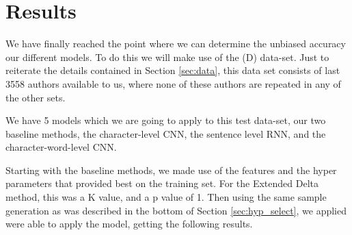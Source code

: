 \section{Results} \label{sec:results}

We have finally reached the point where we can determine the unbiased accuracy
our different models. To do this we will make use of the (D) data-set. Just
to reiterate the details contained in Section \ref{sec:data}, this data set
consists of last 3558 authors available to us, where none of these authors are
repeated in any of the other sets.

We have 5 models which we are going to apply to this test data-set,
our two baseline methods, the character-level \gls{CNN}, the sentence
level RNN, and the character-word-level \gls{CNN}.

Starting with the baseline methods, we made use of the features and the
hyper parameters that provided best on the training set.
For the Extended Delta method, this was a K value, and a p value of 1.
Then using the same sample generation as was described in the bottom
of Section \ref{sec:hyp_select}, we applied were able to apply the model,
getting the following results.
